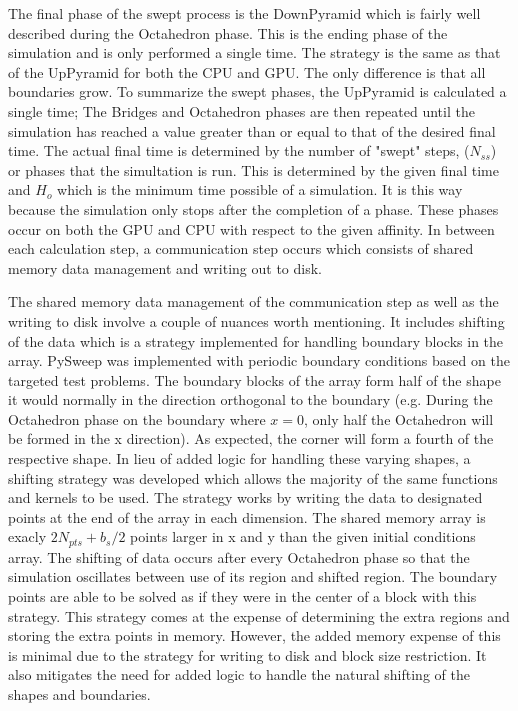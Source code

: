 \documentclass[review]{elsarticle}
\begin{document}
\par The final phase of the swept process is the DownPyramid which is fairly well described during the Octahedron phase. This is the ending phase of the simulation and is only performed a single time. The strategy is the same as that of the UpPyramid for both the CPU and GPU. The only difference is that all boundaries grow. To summarize the swept phases, the UpPyramid is calculated a single time; The Bridges and Octahedron phases are then repeated until the simulation has reached a value greater than or equal to that of the desired final time.
The actual final time is determined by the number of "swept" steps, ($N_{ss}$) or phases that the simultation is run. This is determined by the given final time and $H_{o}$ which is the minimum time possible of a simulation. It is this way because the simulation only stops after the completion of a phase. These phases occur on both the GPU and CPU with respect to the given affinity. In between each calculation step, a communication step occurs  which consists of shared memory data management and writing out to disk.

\par The shared memory data management of the communication step as well as the writing to disk involve a couple of nuances worth mentioning. It includes shifting of the data which is a strategy implemented for handling boundary blocks in the array. PySweep was implemented with periodic boundary conditions based on the targeted test problems. The boundary blocks of the array form half of the shape it would normally in the direction orthogonal to the boundary (e.g. During the Octahedron phase on the boundary where $x=0$, only half the Octahedron will be formed in the x direction). As expected, the corner will form a fourth of the respective shape. In lieu of added logic for handling these varying shapes, a shifting strategy was developed which allows the majority of the same functions and kernels to be used. The strategy works by writing the data to designated points at the end of the array in each dimension. The shared memory array is exacly $2N_{pts}+b_{s}/2$ points larger in x and y than the given initial conditions array. The shifting of data occurs after every Octahedron phase so that the simulation oscillates between use of its region and shifted region. The boundary points are able to be solved as if they were in the center of a block with this strategy. This strategy comes at the expense of determining the extra regions and storing the extra points in memory. However, the added memory expense of this is minimal due to the strategy for writing to disk and block size restriction. It also mitigates the need for added logic to handle the natural shifting of the shapes and boundaries.
\end{document}
